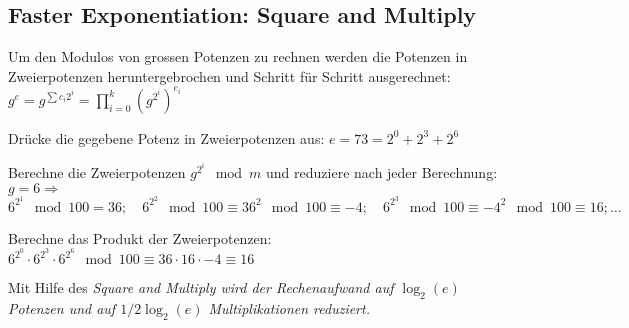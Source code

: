 \subsection{Faster Exponentiation: Square and Multiply}
Um den Modulos von grossen Potenzen zu rechnen werden die Potenzen in Zweierpotenzen heruntergebrochen und Schritt für Schritt ausgerechnet:\\
$g^e=g^{\sum c_i 2^i}=\prod_{i=0}^k \left(g^{2^i}\right)^{e_i}$
\begin{aufzaehlung}
\item Drücke die gegebene Potenz in Zweierpotenzen aus: $e=73=2^0+2^3+2^6$
\item Berechne die Zweierpotenzen $g^{2^i} \mod m$ und reduziere nach jeder Berechnung: $g=6\Rightarrow$\\ 
$6^{2^1} \mod 100 = 36;\quad 6^{2^2} \mod 100 \equiv 36^2  \mod 100 \equiv -4;\quad  6^{2^3} \mod 100 \equiv {-4}^2 \mod 100 \equiv 16; \ldots$
\item Berechne das Produkt der Zweierpotenzen: $6^{2^0}\cdot6^{2^3}\cdot6^{2^6}\mod 100\equiv 36 \cdot 16 \cdot -4 \equiv 16$
\end{aufzaehlung}
Mit Hilfe des \em Square and Multiply \em wird der Rechenaufwand auf $\log_2(e)$ Potenzen und auf $1/2 \log_2(e)$ Multiplikationen reduziert.

